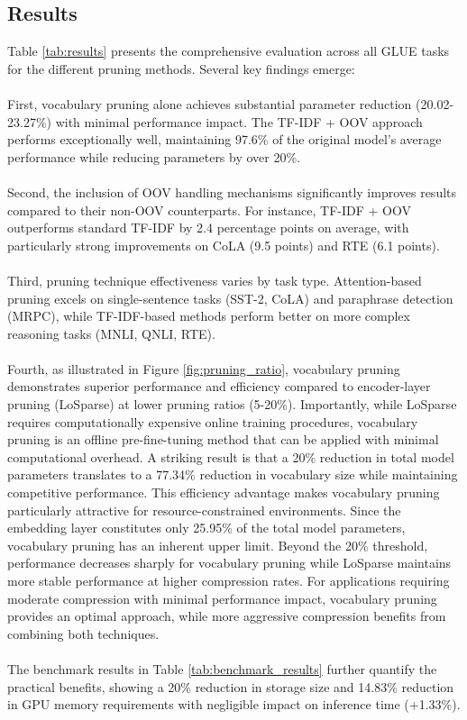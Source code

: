 \documentclass[twocolumn]{article}
\begin{document}
\subsection{Results}
Table \ref{tab:results} presents the comprehensive evaluation across all GLUE tasks for the different pruning methods. Several key findings emerge:
\\ \\
First, vocabulary pruning alone achieves substantial parameter reduction (20.02-23.27\%) with minimal performance impact. The TF-IDF + OOV approach performs exceptionally well, maintaining 97.6\% of the original model's average performance while reducing parameters by over 20\%.
\\ \\
Second, the inclusion of OOV handling mechanisms significantly improves results compared to their non-OOV counterparts. For instance, TF-IDF + OOV outperforms standard TF-IDF by 2.4 percentage points on average, with particularly strong improvements on CoLA (9.5 points) and RTE (6.1 points).
\\ \\
Third, pruning technique effectiveness varies by task type. Attention-based pruning excels on single-sentence tasks (SST-2, CoLA) and paraphrase detection (MRPC), while TF-IDF-based methods perform better on more complex reasoning tasks (MNLI, QNLI, RTE).
\\ \\
Fourth, as illustrated in Figure \ref{fig:pruning_ratio}, vocabulary pruning demonstrates superior performance and efficiency compared to encoder-layer pruning (LoSparse) at lower pruning ratios (5-20\%). Importantly, while LoSparse requires computationally expensive online training procedures, vocabulary pruning is an offline pre-fine-tuning method that can be applied with minimal computational overhead. A striking result is that a 20\% reduction in total model parameters translates to a 77.34\% reduction in vocabulary size while maintaining competitive performance. This efficiency advantage makes vocabulary pruning particularly attractive for resource-constrained environments. Since the embedding layer constitutes only 25.95\% of the total model parameters, vocabulary pruning has an inherent upper limit. Beyond the 20\% threshold, performance decreases sharply for vocabulary pruning while LoSparse maintains more stable performance at higher compression rates. For applications requiring moderate compression with minimal performance impact, vocabulary pruning provides an optimal approach, while more aggressive compression benefits from combining both techniques.
\\ \\
The benchmark results in Table \ref{tab:benchmark_results} further quantify the practical benefits, showing a 20\% reduction in storage size and 14.83\% reduction in GPU memory requirements with negligible impact on inference time (+1.33\%).
\end{document}
